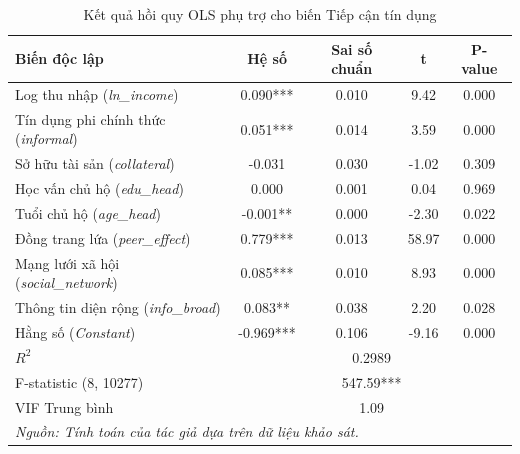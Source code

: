 \documentclass[12pt,a4paper]{report}
\begin{document}
\begin{table}[htbp]
	\centering
	\caption{Kết quả hồi quy OLS phụ trợ cho biến Tiếp cận tín dụng}
	\label{tab:vif_regression}
	\small
	\begin{tabular}{lcccc}
		\toprule
		\textbf{Biến độc lập} & \textbf{Hệ số} & \textbf{Sai số chuẩn} & \textbf{t} & \textbf{P-value} \\
		\midrule
		Log thu nhập (\textit{ln\_income}) & 0.090*** & 0.010 & 9.42 & 0.000 \\
		Tín dụng phi chính thức (\textit{informal}) & 0.051*** & 0.014 & 3.59 & 0.000 \\
		Sở hữu tài sản (\textit{collateral}) & -0.031 & 0.030 & -1.02 & 0.309 \\
		Học vấn chủ hộ (\textit{edu\_head}) & 0.000 & 0.001 & 0.04 & 0.969 \\
		Tuổi chủ hộ (\textit{age\_head}) & -0.001** & 0.000 & -2.30 & 0.022 \\
		Đồng trang lứa (\textit{peer\_effect}) & 0.779*** & 0.013 & 58.97 & 0.000 \\
		Mạng lưới xã hội (\textit{social\_network}) & 0.085*** & 0.010 & 8.93 & 0.000 \\
		Thông tin diện rộng (\textit{info\_broad}) & 0.083** & 0.038 & 2.20 & 0.028 \\
		Hằng số (\textit{Constant}) & -0.969*** & 0.106 & -9.16 & 0.000 \\
		\midrule
		$R^2$ & \multicolumn{4}{c}{0.2989} \\
		F-statistic (8, 10277) & \multicolumn{4}{c}{547.59***} \\
		VIF Trung bình & \multicolumn{4}{c}{1.09} \\
		\bottomrule
		\multicolumn{5}{l}{\footnotesize \textit{Nguồn: Tính toán của tác giả dựa trên dữ liệu khảo sát.}}
	\end{tabular}
\end{table}
\end{document}
